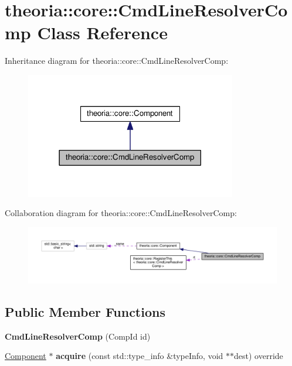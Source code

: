 \hypertarget{classtheoria_1_1core_1_1CmdLineResolverComp}{}\section{theoria\+:\+:core\+:\+:Cmd\+Line\+Resolver\+Comp Class Reference}
\label{classtheoria_1_1core_1_1CmdLineResolverComp}


Inheritance diagram for theoria\+:\+:core\+:\+:Cmd\+Line\+Resolver\+Comp\+:
\nopagebreak
\begin{figure}[H]
\begin{center}
\leavevmode
\includegraphics[width=261pt]{classtheoria_1_1core_1_1CmdLineResolverComp__inherit__graph}
\end{center}
\end{figure}


Collaboration diagram for theoria\+:\+:core\+:\+:Cmd\+Line\+Resolver\+Comp\+:
\nopagebreak
\begin{figure}[H]
\begin{center}
\leavevmode
\includegraphics[width=350pt]{classtheoria_1_1core_1_1CmdLineResolverComp__coll__graph}
\end{center}
\end{figure}
\subsection*{Public Member Functions}
\begin{DoxyCompactItemize}
\item 
\mbox{\label{classtheoria_1_1core_1_1CmdLineResolverComp_a4ed2c4896e0d20384e78c588f158c172}} 
{\bfseries Cmd\+Line\+Resolver\+Comp} (Comp\+Id id)
\item 
\mbox{\label{classtheoria_1_1core_1_1CmdLineResolverComp_a51c66e964d559b3e13f4386c0bf0e0c0}} 
\hyperlink{classtheoria_1_1core_1_1Component}{Component} $\ast$ {\bfseries acquire} (const std\+::type\+\_\+info \&type\+Info, void $\ast$$\ast$dest) override
\end{DoxyCompactItemize}
